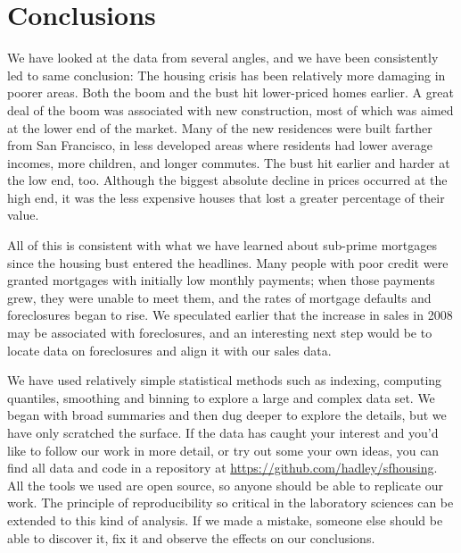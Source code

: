 \documentclass[oneside]{article}
\begin{document}
\section{Conclusions}


We have looked at the data from several angles, and we have been consistently led to same conclusion: The housing crisis has been relatively more damaging in poorer areas.  Both the boom and the bust hit lower-priced homes earlier.  A great deal of the boom was associated with new construction, most of which was aimed at the lower end of the market.  Many of the new residences were built farther from San Francisco, in less developed areas where residents had lower average incomes, more children, and longer commutes.  The bust hit earlier and harder at the low end, too.  Although the biggest absolute decline in prices occurred at the high end, it was the less expensive houses that lost a greater percentage of their value.  

All of this is consistent with what we have learned about sub-prime mortgages since the housing bust entered the headlines.  Many people with poor credit were granted mortgages with initially low monthly payments; when those payments grew, they were unable to meet them, and the rates of mortgage defaults and foreclosures began to rise.  We speculated earlier that the increase in sales in 2008 may be associated with foreclosures, and an interesting next step would be to locate data on foreclosures and align it with our sales data.

We have used relatively simple statistical methods such as indexing, computing quantiles, smoothing and binning to explore a large and complex data set.  We began with broad summaries and then dug deeper to explore the details, but we have only scratched the surface.  If the data has caught your interest and you'd like to follow our work in more detail, or try out some your own ideas, you can find all data and code in a repository at \url{https://github.com/hadley/sfhousing}.  All the tools we used are open source, so anyone should be able to replicate our work. The principle of reproducibility \citep{gentleman:2007} so critical in the laboratory sciences can be extended to this kind of analysis.  If we made a mistake, someone else should be able to discover it, fix it and observe the effects on our conclusions.  
\end{document}
